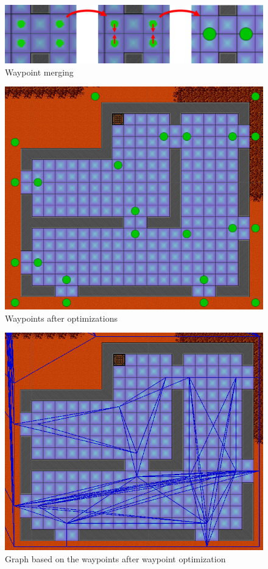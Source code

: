 \begin{figure}[H]
	\includegraphics[width=\textwidth]{figures/astar/waypointMerge}
	\caption{Waypoint merging}
	\label{waypointMerge}
\end{figure}

\begin{figure}[H]
	\includegraphics[width=\textwidth]{figures/astar/optimizedWaypoints}
	\caption{Waypoints after optimizations}
	\label{waypointOpt}
\end{figure}

\begin{figure}[H]
	\includegraphics[width=\textwidth]{figures/astar/optimizedWaypointsGraph}
	\caption{Graph based on the waypoints after waypoint optimization}
	\label{waypointgraphOpt}
\end{figure}


